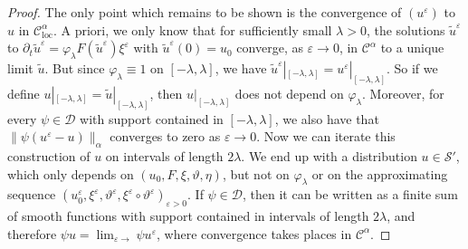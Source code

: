 \documentclass[a4paper,11pt]{article}
\newcommand{\tmop}[1]{\ensuremath{\operatorname{#1}}}
\theoremstyle{remark}
\newcommand{\CC}{\ensuremath{\mathscr{C}}}
\newcommand{\CD}{\ensuremath{\mathscr{D}}}
\newcommand{\CS}{\ensuremath{\mathscr{S}}}
\newcommand{\reso}{\,\mathord{\circ}\,}
\begin{document}
\begin{proof}
  The only point which remains to be shown is the convergence of $(u^{\varepsilon} )$ to $u$ in $\CC^{\alpha}_{\tmop{loc}}$. A priori,
  we only know that for sufficiently small $\lambda >0$, the solutions
  $\tilde{u}^{\varepsilon}$ to $\partial_{t} \tilde{u}^{\varepsilon} = \varphi_{\lambda} F ( \tilde{u}^{\varepsilon} ) \xi^{\varepsilon}$ with
  $\tilde{u}^{\varepsilon} ( 0 ) =u_{0}$ converge, as $\varepsilon \rightarrow 0$, in $  \CC^{\alpha}$ to a unique limit $\tilde{u}$.
  But since $\varphi_{\lambda} \equiv 1$ on $[ - \lambda, \lambda]$, we
  have $\tilde{u}^{\varepsilon} |_{[ - \lambda, \lambda]} =u^{\varepsilon} |_{[ - \lambda, \lambda ]}$. So if we define $u|_{[ -  \lambda, \lambda ]} = \tilde{u} |_{[ - \lambda, \lambda]}$, then
  $u|_{[ - \lambda, \lambda]}$ does not depend on $\varphi_{\lambda}$.
  Moreover, for every $\psi \in \CD$ with support contained in $[ - \lambda, \lambda]$, we also have that $\| \psi ( u^{\varepsilon} -u ) \|_{\alpha}$ converges to zero as $\varepsilon \rightarrow 0$. Now we can
  iterate this construction of $u$ on intervals of length $2 \lambda$. We
  end up with a distribution $u \in \CS'$, which only depends
  on $( u_{0} ,F, \xi , \vartheta , \eta )$, but not on $\varphi_{\lambda}$
  or on the approximating sequence $(u_0^\varepsilon, \xi^{\varepsilon} , \vartheta^{\varepsilon} , \xi^{\varepsilon} \reso \vartheta^{\varepsilon} )_{\varepsilon >0}$. If $\psi \in \CD$, then it can be written as a
  finite sum of smooth functions with support contained in intervals of length
  $2 \lambda$, and therefore $\psi u= \lim_{\varepsilon \rightarrow} \psi u^{\varepsilon}$, where convergence takes places in $\CC^{\alpha}$.
\end{proof}
\end{document}
